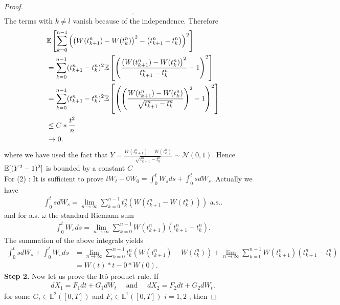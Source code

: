 \begin{proof}
\begin{align*}
  .\end{align*}
  The terms with $k\neq l$ vanish because of the independence. Therefore
  \begin{align*}
    &\mathbb{E} \left[ \sum_{k=0}^{n-1}\left( \left( W(t_{k+1}^{n} ) - W(t_k^{n})\right)^2 - \left( t_{k+1}^{n} - t_k^{n}   \right)   \right)^2   \right] \\ 
    &= \sum_{k=0}^{n-1}(t_{k+1}^{n} - t_k^{n}  )^2 \mathbb{E} \left[ \left( \frac{\left( W(t_{k+1}^{n} ) - W(t_k^{n} ) \right)^2 }{t_{k+1}^{n} - t_{k}^{n}  } - 1 \right)^2  \right]  \\
    &= \sum_{k=0}^{n-1}(t_{k+1}^{n} - t_k^{n}  )^2 \mathbb{E} \left[ \left( \left(\frac{ W(t_{k+1}^{n} ) - W(t_k^{n} ) }{\sqrt{t_{k+1}^{n} - t_{k}^{n}}  } \right)^2 - 1 \right)^2  \right]  \\
    &\le C*\frac{t^2}{n}\\
    &\to  0
  .\end{align*}
  where we have used the fact that $Y = \frac{ W(t_{k+1}^{n} ) - W(t_k^{n} ) }{\sqrt{t_{k+1}^{n} - t_{k}^{n}}  } \sim \mathcal{N}(0,1)$. Hence $\mathbb{E}[(Y^2 - 1)^2]$ is 
  bounded by a constant $C$\\[1ex]
  For (2) : It is sufficient to prove $tW_t - 0 W_0 =  \int_0^{t} W_s ds + \int_0^{t} s dW_s  $. Actually we have 
  \begin{align*}
    \int_0^{t} s dW_s = \lim_{n\to \infty}  \sum_{k=0}^{n-1} t_k^{n}\left( W(t_{k+1}^{n} - W(t_k^{n} )  ) \right)  \text{ a.s.}
  .\end{align*}
  and for a.s. $\omega $ the standard Riemann sum
  \begin{align*}
    \int_0^{t} W_s ds = \lim_{n\to \infty}  \sum_{k=0}^{n-1} W(t_{k+1}^{n} )(t_{k+1}^{n} - t_k^{n}  )
  .\end{align*}
  The summation of the above integrals yields 
  \begin{align*}
    \int_0^{t} s dW_s  + \int_0^{t} W_s ds &= \lim_{n\to \infty}   \sum_{k=0}^{n-1} t_k^{n}\left( W(t_{k+1}^{n}) -W(t_k^{n} ) \right) + \lim_{n\to \infty}\sum_{k=0}^{n-1} W(t_{k+1}^{n} ) (t_{k+1}^{n} - t_k^{n}  )\\
                                           &= W(t)*t - 0*W(0)
  .\end{align*}
  \textbf{Step 2.} Now let us prove the It\^o product rule. If 
  \begin{align*}
    dX_{1} = F_{1}dt + G_{1}dW_t \quad \text{ and } \quad dX_{2} = F_{2}dt+G_{2}dW_t
  .\end{align*}
  for some $G_i \in  \mathbb{L}^2([0,T])$ and $F_i \in  \mathbb{L}^1([0,T])$ $i=1,2$ , then 

\end{proof}
